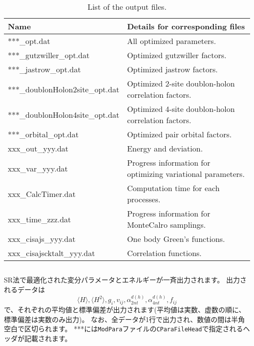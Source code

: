  \begin{table*}[h!]
\begin{center}
  \begin{tabular}{|ll|} \hline
           Name     & Details for corresponding files       \\   \hline\hline
           ***\_opt.dat       &  All optimized parameters.       \\ \hline 
           ***\_gutzwiller\_opt.dat       &   Optimized gutzwiller factors.  \\
           ***\_jastrow\_opt.dat        &  Optimized jastrow factors.         \\ 
           ***\_doublonHolon2site\_opt.dat  &   Optimized 2-site doublon-holon correlation factors.  \\  
           ***\_doublonHolon4site\_opt.dat  &   Optimized 4-site doublon-holon correlation factors. \\  
           ***\_orbital\_opt.dat  &   Optimized pair orbital factors. \\  \hline
           xxx\_out\_yyy.dat &  Energy and deviation.\\ 
           xxx\_var\_yyy.dat &  Progress information for optimizing variational parameters.\\  \hline
           xxx\_CalcTimer.dat & Computation time for each processes.\\  
           xxx\_time\_zzz.dat & Progress information for MonteCalro samplings.\\  \hline
           \hline
           xxx\_cisajs\_yyy.dat & One body Green's functions.\\
           xxx\_cisajscktalt\_yyy.dat & Correlation functions.\\
\hline
  \end{tabular}
\end{center}
\caption{List of the output files. }
\label{Table:Output}
\end{table*}%

\subsection{}
SR法で最適化された変分パラメータとエネルギーが一斉出力されます。
出力されるデータは
\begin{equation}
\langle H \rangle, \langle H^2 \rangle, g_i, v_{ij}, \alpha_{2nt}^{d(h)}, \alpha_{4nt}^{d(h)}, f_{ij} \nonumber
\end{equation}
で、それぞれの平均値と標準偏差が出力されます(平均値は実数、虚数の順に、標準偏差は実数のみ出力)。
なお、全データが1行で出力され、数値の間は半角空白で区切られます。
***には\verb|ModPara|ファイルの\verb|CParaFileHead|で指定されるヘッダが記載されます。

